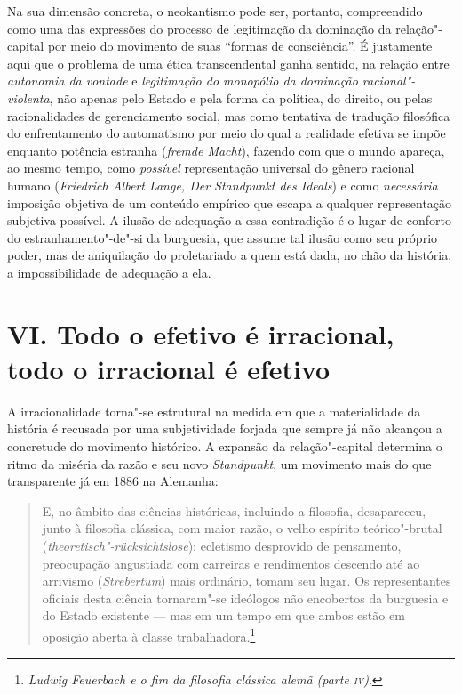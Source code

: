 Na sua dimensão concreta, o neokantismo pode ser, portanto, compreendido
como uma das expressões do processo de legitimação da dominação da
relação"-capital por meio do movimento de suas ``formas de consciência''.
É justamente aqui que o problema de uma ética transcendental ganha
sentido, na relação entre \emph{autonomia da vontade} e
\emph{legitimação do monopólio da dominação racional"-violenta}, não
apenas pelo Estado e pela forma da política, do direito, ou pelas
racionalidades de gerenciamento social, mas como tentativa de tradução
filosófica do enfrentamento do automatismo por meio do qual a realidade
efetiva se impõe enquanto potência estranha (\emph{fremde Macht}),
fazendo com que o mundo apareça, ao mesmo tempo, como \emph{possível}
representação universal do gênero racional humano (\emph{Friedrich
Albert Lange, Der Standpunkt des Ideals}) e como \emph{necessária}
imposição objetiva de um conteúdo empírico que escapa a qualquer
representação subjetiva possível. A ilusão de adequação a essa
contradição é o lugar de conforto do estranhamento"-de"-si da burguesia,
que assume tal ilusão como seu próprio poder, mas de aniquilação do
proletariado a quem está dada, no chão da história, a impossibilidade de
adequação a ela.

\section*{VI. Todo o efetivo é irracional, todo o irracional é efetivo}

A irracionalidade torna"-se estrutural na medida em que a materialidade
da história é recusada por uma subjetividade forjada que sempre já não
alcançou a concretude do movimento histórico. A expansão da
relação"-capital determina o ritmo da miséria da razão e seu novo
\emph{Standpunkt}, um movimento mais do que transparente já em 1886 na
Alemanha:

\begin{quote}
E, no âmbito das ciências históricas, incluindo a filosofia,
desapareceu, junto à filosofia clássica, com maior razão, o velho
espírito teórico"-brutal (\emph{theoretisch"-rücksichtslose}): ecletismo
desprovido de pensamento, preocupação angustiada com carreiras e
rendimentos descendo até ao arrivismo (\emph{Strebertum}) mais
ordinário, tomam seu lugar. Os representantes oficiais desta ciência
tornaram"-se ideólogos não encobertos da burguesia e do Estado existente
--- mas em um tempo em que ambos estão em oposição aberta à classe
trabalhadora.\footnote{\emph{Ludwig Feuerbach e o fim da filosofia
  clássica alemã (parte \textsc{iv})}.}
\end{quote}

